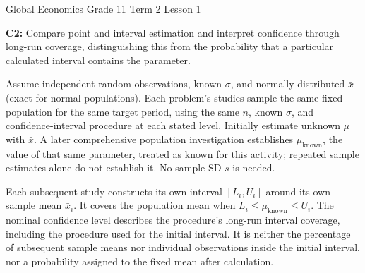 \newcommand{\BlankInformationTable}{
\InformationTable{
$\mu$&Population mean&Population parameters&\\[23pt]
$\mu_{\mathrm{known}}$&Later established population mean&&\\[18pt]
$\sigma$&Population standard deviation&&\\[18pt]\midrule
$\bar{x}$&Sample mean&Sample statistics&\\[18pt]
$n$&Sample size&&\\[18pt]
$\mathrm{SE}$&Standard error&&\\[27pt]\midrule
$C$&Confidence level&Procedure Settings&\\[18pt]
$\alpha$&Significance level&&\\[18pt]
$\alpha/2$&Tail area&&\\[18pt]
$z^*$&Critical value&&\\[18pt]}}

{
Global Economics \textbar{} Grade 11 \textbar{} Term 2 \textbar{} Lesson 1\par}
\textbf{C2:} Compare point and interval estimation and interpret confidence through long-run coverage, distinguishing this from the probability that a particular calculated interval contains the parameter.

Assume independent random observations, known $\sigma$, and normally distributed $\bar{x}$ (exact for normal populations). Each problem's studies sample the same fixed population for the same target period, using the same $n$, known $\sigma$, and confidence-interval procedure at each stated level. Initially estimate unknown $\mu$ with $\bar{x}$. A later comprehensive population investigation establishes $\mu_{\mathrm{known}}$, the value of that same parameter, treated as known for this activity; repeated sample estimates alone do not establish it. No sample SD $s$ is needed.

Each subsequent study constructs its own interval $[L_i,U_i]$ around its own sample mean $\bar{x}_i$. It covers the population mean when $L_i\leq\mu_{\mathrm{known}}\leq U_i$. The nominal confidence level describes the procedure's long-run interval coverage, including the procedure used for the initial interval. It is neither the percentage of subsequent sample means nor individual observations inside the initial interval, nor a probability assigned to the fixed mean after calculation.

